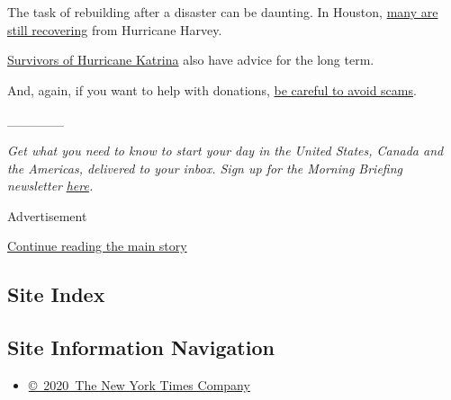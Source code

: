 The task of rebuilding after a disaster can be daunting. In Houston,
\href{https://www.nytimes3xbfgragh.onion/2017/09/11/us/houston-harvey-home-displaced.html?hp\&action=click\&pgtype=Homepage\&clickSource=story-heading\&module=b-lede-package-region\&region=top-news\&WT.nav=top-news}{many
are still recovering} from Hurricane Harvey.

\href{https://www.nytimes3xbfgragh.onion/2017/09/08/health/katrina-harvey-children.html}{Survivors
of Hurricane Katrina} also have advice for the long term.

And, again, if you want to help with donations,
\href{https://www.nytimes3xbfgragh.onion/2017/09/08/us/hurricane-irma-help-donate.html}{be
careful to avoid scams}.

\_\_\_\_\_\_

\emph{Get what you need to know to start your day in the United States,
Canada and the Americas, delivered to your inbox. Sign up for the
Morning Briefing newsletter}
\href{https://www.nytimes3xbfgragh.onion/newsletters/morning-briefing}{\emph{here}}\emph{.}

Advertisement

\protect\hyperlink{after-bottom}{Continue reading the main story}

\hypertarget{site-index}{%
\subsection{Site Index}\label{site-index}}

\hypertarget{site-information-navigation}{%
\subsection{Site Information
Navigation}\label{site-information-navigation}}

\begin{itemize}
\tightlist
\item
  \href{https://help.nytimes3xbfgragh.onion/hc/en-us/articles/115014792127-Copyright-notice}{©~2020~The
  New York Times Company}
\end{itemize}

